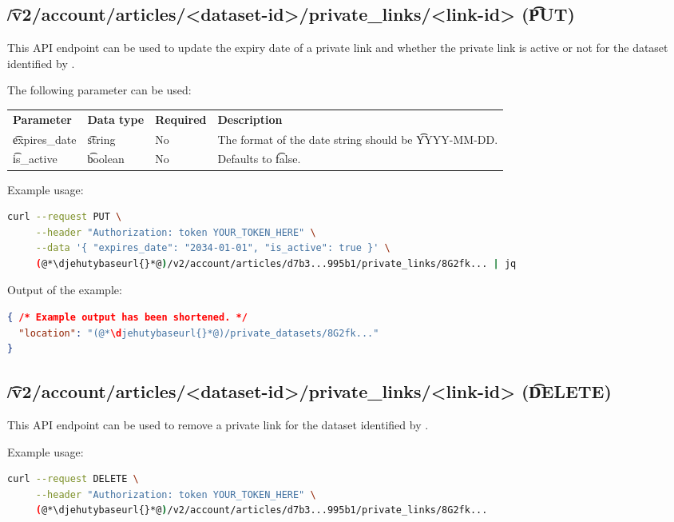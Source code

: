 \subsection{\t{/v2/account/articles/<dataset-id>/private\_links/<link-id>} (\t{PUT})}

  This API endpoint can be used to update the expiry date of a private link
  and whether the private link is active or not for the dataset identified
  by .

  The following parameter can be used:

\begin{tabularx}{\textwidth}{*{3}{!{\VRule[-1pt]}l}!{\VRule[-1pt]}X}
  \headrow
  \textbf{Parameter} & \textbf{Data type} & \textbf{Required} & \textbf{Description}\\
  \t{expires\_date}  & \t{string}         & No                & The format of the date string
                                                                should be \t{YYYY-MM-DD}.\\
  \t{is\_active}     & \t{boolean}        & No                & Defaults to \t{false}.\\
\end{tabularx}

  Example usage:
\begin{lstlisting}[language=bash]
curl --request PUT \
     --header "Authorization: token YOUR_TOKEN_HERE" \
     --data '{ "expires_date": "2034-01-01", "is_active": true }' \
     (@*\djehutybaseurl{}*@)/v2/account/articles/d7b3...995b1/private_links/8G2fk... | jq
\end{lstlisting}

  Output of the example:
\begin{lstlisting}[language=JSON]
{ /* Example output has been shortened. */
  "location": "(@*\djehutybaseurl{}*@)/private_datasets/8G2fk..."
}
\end{lstlisting}

\subsection{\t{/v2/account/articles/<dataset-id>/private\_links/<link-id>} (\t{DELETE})}

  This API endpoint can be used to remove a private link for the dataset identified
  by \code{dataset-id}.

  Example usage:
\begin{lstlisting}[language=bash]
curl --request DELETE \
     --header "Authorization: token YOUR_TOKEN_HERE" \
     (@*\djehutybaseurl{}*@)/v2/account/articles/d7b3...995b1/private_links/8G2fk...
\end{lstlisting}

